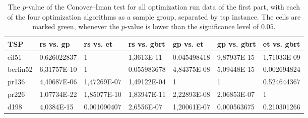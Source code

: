 \begin{table}[h]
	\centering
	\caption[The $p$-value of the Conover–Iman test for all optimization run data of the first part]{The $p$-value of the Conover–Iman test for all optimization run data of the first part, with each of the four optimization algorithms as a sample group, separated by \gls{tsp} instance. The cells are marked green, whenever the $p$-value is lower than the significance level of $0.05$.}
	\label{tab:conover-p}
	
	\begin{adjustbox}{width=1\textwidth}
		\begin{tabular}{ l | l  l  l  l  l  l}
			\hline
			TSP & \gls{rs} vs. \gls{gp} & \gls{rs} vs. \gls{et} & \gls{rs} vs. \gls{gbrt} & \gls{gp} vs. \gls{et} & \gls{gp} vs. \gls{gbrt} & \gls{et} vs. \gls{gbrt} \\ \hline
			eil51 & \num{0.626022837} & \num{1} & \cellcolor{green!25} \num{1,3613E-11} & \cellcolor{green!25} \num{0,045498418} &  \cellcolor{green!25} \num{9,87937E-15} &\cellcolor{green!25}  \num{1,71033E-09} \\ 
			berlin52 & \cellcolor{green!25} \num{6,31757E-10} & \num{1} & \num{0,055983678} & \cellcolor{green!25} \num{4,84375E-08} & \cellcolor{green!25} \num{5,09448E-15} & \cellcolor{green!25} \num{0,002694824} \\
			pr136 & \cellcolor{green!25} \num{4,40687E-06} &\cellcolor{green!25}  \num{1,47269E-07} & \cellcolor{green!25} \num{1,49122E-04} & \num{1} & \num{1} & \num{0,524644367} \\
			pr226 & \cellcolor{green!25} \num{1,07734E-22} & \cellcolor{green!25} \num{1,85077E-10} & \cellcolor{green!25} \num{1,83947E-11} & \cellcolor{green!25} \num{2,22893E-08} & \cellcolor{green!25} \num{2,06853E-07} & \num{1} \\ 
			d198 & \cellcolor{green!25} \num{4,0384E-15} & \cellcolor{green!25} \num{0,001090407} & \cellcolor{green!25} \num{2,6556E-07} & \cellcolor{green!25} \num{1,20061E-07} & \cellcolor{green!25}  \num{0,000563675} & \num{0,210301266}  \\ \hline
		\end{tabular}
	\end{adjustbox}
\end{table}

